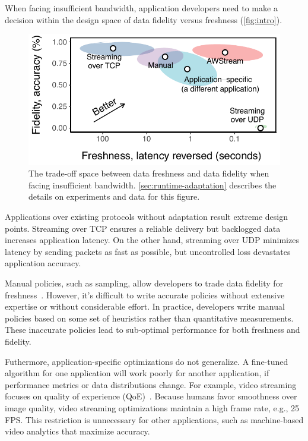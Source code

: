 When facing insufficient bandwidth, application developers need to make a
decision within the design space of data fidelity versus freshness (\autoref{fig:intro}).

\begin{figure}
  \centering
  \includegraphics[width=0.9\columnwidth]{figures/figure1a.pdf}
  \caption{The trade-off space between data freshness and data fidelity when
    facing insufficient bandwidth. \autoref{sec:runtime-adaptation} describes
    the details on experiments and data for this figure.}
  \label{fig:intro}
  \vspace{-1em}
\end{figure}

Applications over existing protocols without adaptation result
extreme design points. Streaming over TCP ensures a reliable
delivery but backlogged data increases application latency. On the other hand, streaming over
UDP minimizes latency by sending packets as fast as possible, but
uncontrolled loss devastates application accuracy.

Manual policies, such as sampling, allow developers to trade data
fidelity for freshness~\cite{rabkin2014aggregation}.
However, it's difficult to write accurate policies without extensive expertise or without considerable effort.
In practice, developers write manual policies based on some set of heuristics rather than quantitative measurements.
These inaccurate policies lead to sub-optimal performance for both freshness and fidelity.

Futhermore, application-specific optimizations do not generalize. A fine-tuned
algorithm for one application will work poorly for another application, if
performance metrics or data distributions change.
For example, video streaming focuses on quality of
experience (QoE)~\cite{yin2015control}.
Because humans favor smoothness over image quality, video streaming optimizations maintain a high frame rate, e.g., 25 FPS\@.
This restriction is unnecessary for other applications, such as machine-based video analytics that maximize accuracy.

